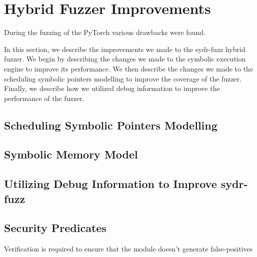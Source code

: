 \section{Hybrid Fuzzer Improvements}

During the fuzzing of the PyTorch various drawbacks were found.

In this section, we describe the improvements we made to the sydr-fuzz hybrid fuzzer. We begin by describing the changes we made to the symbolic execution engine to improve its performance. We then describe the changes we made to the scheduling symbolic pointers modelling to improve the coverage of the fuzzer. Finally, we describe how we utilized debug information to improve the performance of the fuzzer.

\subsection{Scheduling Symbolic Pointers Modelling}

\subsection{Symbolic Memory Model}

\subsection{Utilizing Debug Information to Improve sydr-fuzz} \label{hybrid-fuzzer-improvements:optimizing-security-predicates}

\subsection{Security Predicates}

Verification is required to ensure that the module doesn't generate false-positives
